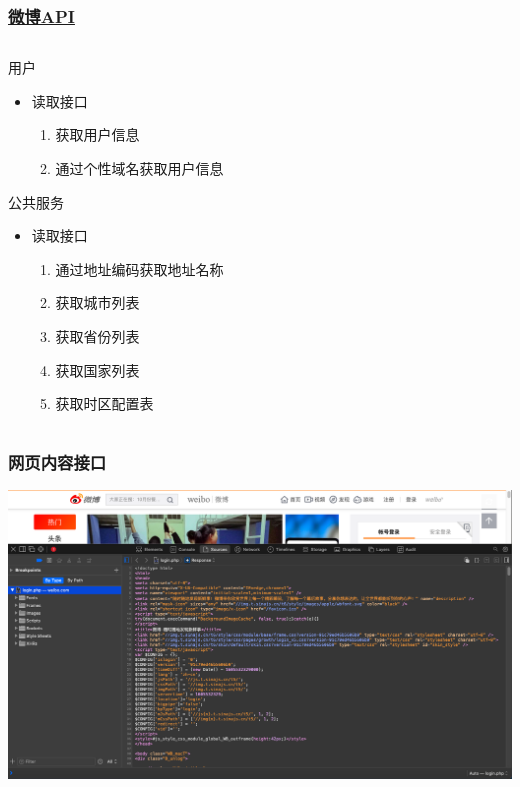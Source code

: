 \documentclass[../Postbot.tex]{subfiles}
\begin{document}
	\begin{frame}
		\frametitle{\href{https://open.weibo.com/wiki/\%E5\%BE\%AE\%E5\%8D\%9AAPI}{微博API}}
		\begin{columns}
			\begin{column}{.9\textwidth}
				用户 \\ 
				\begin{itemize}
					\item {
						读取接口 \\
						\begin{enumerate}
							\item 获取用户信息
							\item 通过个性域名获取用户信息
						\end{enumerate}
						}
				\end{itemize}

				公共服务 \\
				\begin{itemize}
					\item {
						读取接口 \\
						\begin{enumerate}
							\item 通过地址编码获取地址名称
							\item 获取城市列表
							\item 获取省份列表
							\item 获取国家列表
							\item 获取时区配置表
						\end{enumerate}
					}
				\end{itemize}
			\end{column}		
		\end{columns}
	\end{frame}

	\begin{frame}
		\frametitle{网页内容接口}
		\includegraphics[width=\textwidth]{../src/img/Weibo source code.jpg}
	\end{frame}
\end{document}
